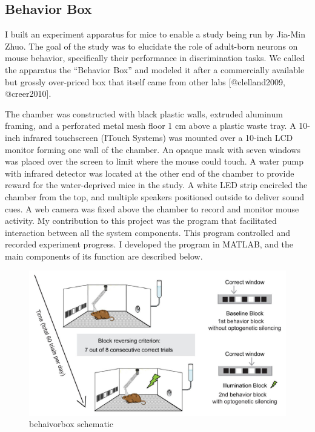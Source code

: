 \subsection{Behavior Box}\label{behavior-box}

I built an experiment apparatus for mice to enable a study being run by
Jia-Min Zhuo. The goal of the study was to elucidate the role of
adult-born neurons on mouse behavior, specifically their performance in
discrimination tasks. We called the apparatus the ``Behavior Box'' and
modeled it after a commercially available but grossly over-priced box
that itself came from other labs {[}@clelland2009, @creer2010{]}.

The chamber was constructed with black plastic walls, extruded aluminum
framing, and a perforated metal mesh floor 1 cm above a plastic waste
tray. A 10-inch infrared touchscreen (ITouch Systems) was mounted over a
10-inch LCD monitor forming one wall of the chamber. An opaque mask with
seven windows was placed over the screen to limit where the mouse could
touch. A water pump with infrared detector was located at the other end
of the chamber to provide reward for the water-deprived mice in the
study. A white LED strip encircled the chamber from the top, and
multiple speakers positioned outside to deliver sound cues. A web camera
was fixed above the chamber to record and monitor mouse activity. My
contribution to this project was the program that facilitated interaction between all the
system components. This program controlled and recorded experiment
progress. I developed the program in MATLAB, and the main components of
its function are described below.

\begin{figure}
\includegraphics[width=15cm]{task-schematic.jpg}
  \caption{behaivorbox schematic}
  \label{fig:behaivorbox schematic}
\end{figure}

